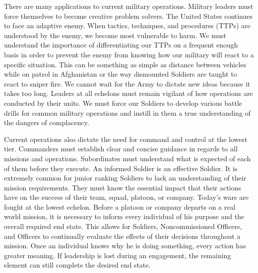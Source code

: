 There are many applications to current military operations.  Military leaders
must force themselves to become creative problem solvers.  The United States
continues to face an adaptive enemy.  When tactics, techniques, and procedures
(TTPs) are understood by the enemy, we become most vulnerable to harm.  We must
understand the importance of differentiating our TTPs on a frequent enough
basis in order to prevent the enemy from knowing how our military will react to
a specific situation.  This can be something as simple as distance between
vehicles while on patrol in Afghanistan or the way dismounted Soldiers are
taught to react to sniper fire.  We cannot wait for the Army to dictate new
ideas because it takes too long.  Leaders at all echelons must remain vigilant
of how operations are conducted by their units.  We must force our Soldiers to
develop various battle drills for common military operations and instill in
them a true understanding of the dangers of complacency.  

Current operations also dictate the need for command and control at the lowest
tier.  Commanders must establish clear and concise guidance in regards to all
missions and operations.  Subordinates must understand what is expected of each
of them before they execute.  An informed Soldier is an effective Soldier.  It
is extremely common for junior ranking Soldiers to lack an understanding of
their mission requirements.  They must know the essential impact that their
actions have on the success of their team, squad, platoon, or company.  Today’s
wars are fought at the lowest echelon.  Before a platoon or company departs on
a real world mission, it is necessary to inform every individual of his purpose
and the overall required end state.   This allows for Soldiers, Noncommissioned
Officers, and Officers to continually evaluate the effects of their decisions
throughout a mission.  Once an individual knows why he is doing something,
every action has greater meaning.  If leadership is lost during an engagement,
the remaining element can still complete the desired end state.  

